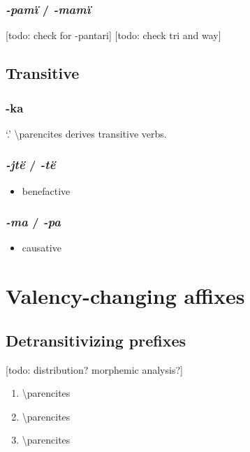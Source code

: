 \documentclass{memoir}
\begin{document}
\subsubsection{\texorpdfstring{\emph{-pamï} /
\emph{-mamï}}{-pamï / -mamï}}

{[}todo: check for -pantari{]} {[}todo: check tri and way{]}

\subsection{Transitive}

\subsubsection{-ka}

 `.' \textbackslash parencites derives
transitive verbs.

\subsubsection{\texorpdfstring{\emph{-jtë} / \emph{-të}}{-jtë / -të}}

\begin{itemize}
\tightlist
\item
  benefactive
\end{itemize}

\subsubsection{\texorpdfstring{\emph{-ma} / \emph{-pa}}{-ma / -pa}}

\begin{itemize}
\tightlist
\item
  causative
\end{itemize}

\section{Valency-changing affixes}

\subsection{\texorpdfstring{Detransitivizing prefixes
\label{sec:detrz}}{Detransitivizing prefixes }}

{[}todo: distribution? morphemic analysis?{]}

\begin{enumerate}
\def\labelenumi{\arabic{enumi}.}
\tightlist
\item
   \textbackslash parencites
\item
   \textbackslash parencites
\item
   \textbackslash parencites
\end{enumerate}
\end{document}
